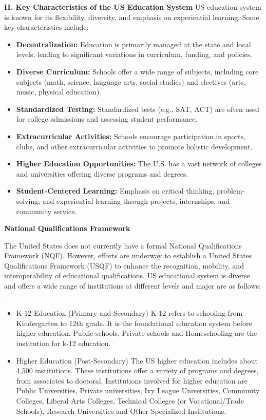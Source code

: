 \textbf{II. Key Characteristics of the US Education System}
US education system is known for its flexibility, diversity, and emphasis on experiential learning. Some key characteristics include:
\begin{itemize}
    \item \textbf{Decentralization:} Education is primarily managed at the state and local levels, leading to significant variations in curriculum, funding, and policies.
    \item \textbf{Diverse Curriculum:} Schools offer a wide range of subjects, including core subjects (math, science, language arts, social studies) and electives (arts, music, physical education).
    \item \textbf{Standardized Testing:} Standardized tests (e.g., SAT, ACT) are often used for college admissions and assessing student performance.
    \item \textbf{Extracurricular Activities:} Schools encourage participation in sports, clubs, and other extracurricular activities to promote holistic development.
    \item \textbf{Higher Education Opportunities:} The U.S. has a vast network of colleges and universities offering diverse programs and degrees.
    \item \textbf{Student-Centered Learning:} Emphasis on critical thinking, problem-solving, and experiential learning through projects, internships, and community service.
\end{itemize}

\textbf{National Qualifications Framework}

The United States does not currently have a formal National Qualifications Framework (NQF). However, efforts are underway to establish a United States Qualifications Framework (USQF) to enhance the recognition, mobility, and interoperability of educational qualifications.
US educational system is diverse and offers a wide range of institutions at different levels and major are as follows: -
\begin{itemize}
    \item K-12 Education (Primary and Secondary)
    K-12 refers to schooling from Kindergarten to 12th grade. It is the foundational education system before higher education. Public schools, Private schools and Homeschooling are the institution for k-12 education.
    \item Higher Education (Post-Secondary)
    The US higher education includes about 4,500 institutions. These institutions offer a variety of programs and degrees, from associates to doctoral. Institutions involved for higher education are Public Universities, Private universities, Ivy League Universities, Community Colleges, Liberal Arts Colleges, Technical Colleges (or Vocational/Trade Schools), Research Universities and Other Specialized Institutions.
\end{itemize}


